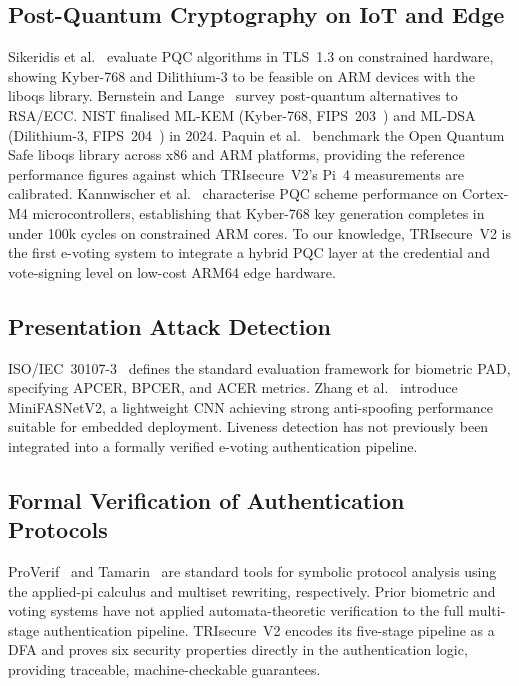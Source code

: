 \documentclass[preprint,12pt]{elsarticle}
\begin{document}
\subsection{Post-Quantum Cryptography on IoT and Edge}

Sikeridis et al.~\cite{sikeridis2020pqc} evaluate PQC algorithms in TLS~1.3
on constrained hardware, showing Kyber-768 and Dilithium-3 to be feasible
on ARM devices with the liboqs library. Bernstein and
Lange~\cite{bernstein2017post} survey post-quantum alternatives to
RSA/ECC. NIST finalised ML-KEM (Kyber-768, FIPS~203~\cite{nist_fips203})
and ML-DSA (Dilithium-3, FIPS~204~\cite{nist_fips204}) in 2024.
Paquin et al.~\cite{paquin2019oqs} benchmark the Open Quantum Safe liboqs
library across x86 and ARM platforms, providing the reference performance
figures against which TRIsecure~V2's Pi~4 measurements are calibrated.
Kannwischer et al.~\cite{kannwischer2019pqm4} characterise PQC scheme
performance on Cortex-M4 microcontrollers, establishing that Kyber-768
key generation completes in under 100k cycles on constrained ARM cores.
To our knowledge, TRIsecure~V2 is the first e-voting system to integrate a
hybrid PQC layer at the credential and vote-signing level on low-cost ARM64
edge hardware.

\subsection{Presentation Attack Detection}

ISO/IEC~30107-3~\cite{iso30107} defines the standard evaluation framework
for biometric PAD, specifying APCER, BPCER, and ACER metrics.
Zhang et al.~\cite{zhang2020minifasnet} introduce MiniFASNetV2, a
lightweight CNN achieving strong anti-spoofing performance suitable for
embedded deployment. Liveness detection has not previously been integrated
into a formally verified e-voting authentication pipeline.

\subsection{Formal Verification of Authentication Protocols}

ProVerif~\cite{blanchet2016proverif} and Tamarin~\cite{meier2013tamarin}
are standard tools for symbolic protocol analysis using the applied-pi
calculus and multiset rewriting, respectively. Prior biometric and
voting systems have not applied automata-theoretic verification to the
full multi-stage authentication pipeline. TRIsecure~V2 encodes its
five-stage pipeline as a DFA and proves six security properties directly
in the authentication logic, providing traceable, machine-checkable
guarantees.
\end{document}
